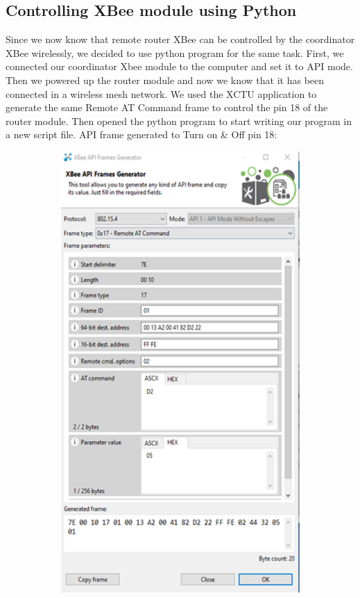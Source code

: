 \documentclass[letter,twocolumn]{report}
\begin{document}
	\subsection{Controlling XBee module using Python}
	\par Since we now know that remote router XBee can be controlled by the coordinator XBee wirelessly, we decided to use python program for the same task. First, we connected our coordinator Xbee module to the computer and set it to API mode. Then we powered up the router module and now we know that it has been connected in a wireless mesh network. We used the XCTU application to generate the same Remote AT Command frame to control the pin 18 of the router module. Then opened the python program to start writing our program in a new script file. API frame generated to Turn on \& Off pin 18: 
	\begin{figure}[h!]
		\centering
		\begin{subfigure}[t]{0.22\textwidth}
			\centering
			\includegraphics[width=\textwidth]{xctuFrames1.png}

\end{subfigure}
\end{figure}
\end{document}
